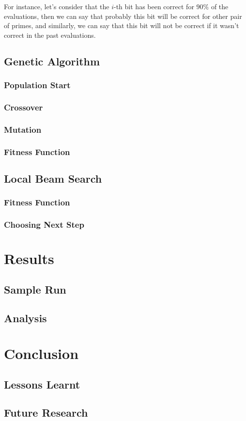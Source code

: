\documentclass[12pt]{article}
\begin{document}
For instance, let's consider that the $i$-th bit has been correct for $90\%$ of the evaluations, then we can say that probably this bit will be correct for other pair of primes, and similarly, we can say that this bit will not be correct if it wasn't correct in the past evaluations.

\subsection{Genetic Algorithm}
\subsubsection{Population Start}
\subsubsection{Crossover}
\subsubsection{Mutation}
\subsubsection{Fitness Function}
\subsection{Local Beam Search}
\subsubsection{Fitness Function}
\subsubsection{Choosing Next Step}


\section{Results}
\subsection{Sample Run}
\subsection{Analysis}


\section{Conclusion}
\subsection{Lessons Learnt}
\subsection{Future Research}
\end{document}
